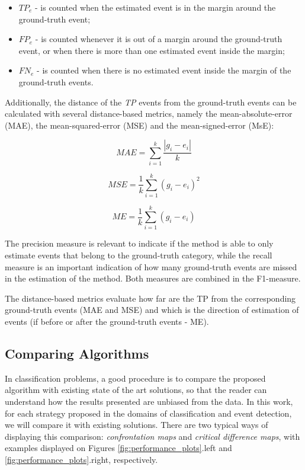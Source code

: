 \begin{itemize}
    \item $TP_e$ - is counted when the estimated event is in the margin around the ground-truth event;
    
    \item $FP_e$ - is counted whenever it is out of a margin around the ground-truth event, or when there is more than one estimated event inside the margin;
    
    \item $FN_e$ - is counted when there is no estimated event inside the margin of the ground-truth events.
    
\end{itemize}

Additionally, the distance of the \textit{TP} events from the ground-truth events can be calculated with several distance-based metrics, namely the mean-absolute-error (MAE), the mean-squared-error (MSE) and the mean-signed-error (MsE):

\begin{equation}
    MAE = \sum^{k}_{i=1} \frac{|g_{i} - e_{i}|}{k}
\end{equation}

\begin{equation}
    MSE = \frac{1}{k} \sum^{k}_{i=1} (g_{i} - e_{i})^2
\end{equation}

\begin{equation}
    ME = \frac{1}{k} \sum^{k}_{i=1} (g_{i} - e_{i})
\end{equation}

The precision measure is relevant to indicate if the method is able to only estimate events that belong to the ground-truth category, while the recall measure is an important indication of how many ground-truth events are missed in the estimation of the method. Both measures are combined in the F1-measure.
\par
The distance-based metrics evaluate how far are the TP from the corresponding ground-truth events (MAE and MSE) and which is the direction of estimation of events (if before or after the ground-truth events - ME).
\par


\subsection{Comparing Algorithms}

In classification problems, a good procedure is to compare the proposed algorithm with existing state of the art solutions, so that the reader can understand how the results presented are unbiased from the data. In this work, for each strategy proposed in the domains of classification and event detection, we will compare it with existing solutions. There are two typical ways of displaying this comparison: \textit{confrontation maps} and \textit{critical difference maps}, with examples displayed on Figures \ref{fig:performance_plots}.left and \ref{fig:performance_plots}.right, respectively.

